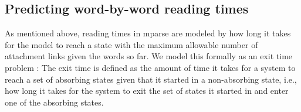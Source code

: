 \documentclass[a4paper, 12pt]{article}
\begin{document}
\subsection{Predicting word-by-word reading times}
As mentioned above, reading times in mparse are modeled by how long it takes
for the model to reach a state with the maximum allowable number of attachment
links given the words so far. We model this formally as an exit time problem
\citep{vankampen2007stochastic, oppenheim1967stochastic,
    oppenheim1977stochastic, weiss1966first}:
The exit time is defined as the amount of time
it takes for a system to reach a set of absorbing states given that it started
in a non-absorbing state, i.e., how long it takes for the system to exit the
set of states it started in and enter one of the absorbing states.%

\end{document}
